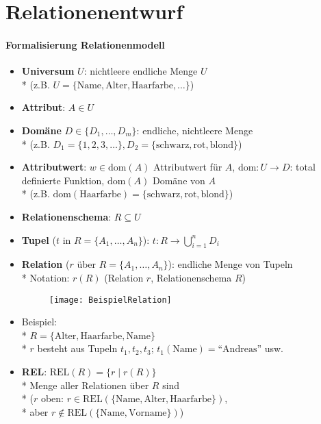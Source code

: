 \section{Relationenentwurf}
\label{sec:relationenentwurf}

\paragraph{Formalisierung Relationenmodell}
\begin{itemize}
	\item \textbf{Universum} \( U \): nichtleere endliche Menge \( U \)\\* (z.B. \( U= \{ \text{Name}, \text{Alter}, \text{Haarfarbe}, \dots \} \))
	\item \textbf{Attribut}: \( A \in U \)
	\item \textbf{Domäne} \( D \in \{ D_1, \dots, D_m \} \): endliche, nichtleere Menge \\* (z.B. \( D_1 = \{ 1,2,3,\dots \}, D_2 = \{ \text{schwarz}, \text{rot}, \text{blond} \} \))
	\item \textbf{Attributwert}: \( w \in \text{dom}(A) \) Attributwert für \( A \), \( \text{dom}: U \to D \): total definierte Funktion, \( \text{dom}(A) \) Domäne von \( A \) \\* (z.B. \( \text{dom}(\text{Haarfarbe}) = \{ \text{schwarz}, \text{rot}, \text{blond} \} \))
	\item \textbf{Relationenschema}: \( R \subseteq U \)
	\item \textbf{Tupel} (\( t \) in \( R = \{ A_1, \dots, A_n \} \)): \( t: R \to \bigcup_{i=1}^n D_i \)
	\item \textbf{Relation} (\( r \) über \( R = \{ A_1, \dots, A_n \} \)): endliche Menge von Tupeln \\* Notation: \( r(R) \) (Relation \( r \), Relationenschema \( R \))
	\begin{figure}[H]\centering\label{BeispielRelation}\texttt{[image: BeispielRelation]}\end{figure}
	\item Beispiel: \\* \( R = \{ \text{Alter}, \text{Haarfarbe}, \text{Name} \} \) \\* \( r \) besteht aus Tupeln \( t_1, t_2, t_3 \); \( t_1(\text{Name}) = \text{``Andreas''} \) usw.
	\item \textbf{REL}: \( \text{REL}(R) = \{ r \mid r(R) \} \) \\* Menge aller Relationen über \( R \) sind \\* (\( r \) oben: \( r \in \text{REL}(\{ \text{Name}, \text{Alter}, \text{Haarfarbe} \}) \), \\* aber \( r \not \in \text{REL}(\{ \text{Name}, \text{Vorname} \}) \))

\end{itemize}
